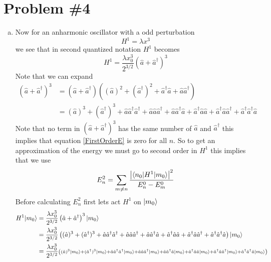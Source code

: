 \documentclass[11pt]{article}
\numberwithin{equation}{section}
\begin{document}
\section{Problem \#4}
\begin{enumerate}[(a)]
\item
Now for an anharmonic oscillator with a odd perturbation 
$$H^1 = \lambda x^3$$
we see that in second quantized notation $H^1$ becomes
$$H^1 = \frac{\lambda x_0^3}{2^{3/2}}\left(\hat{a}+\hat{a}^{\dagger}\right)^3$$
Note that we can expand
\begin{align*}
\left(\hat{a}+\hat{a}^{\dagger}\right)^3 &= \left(\hat{a}+\hat{a}^{\dagger}\right)\left((\hat{a})^2+(\hat{a}^{\dagger})^2 + \hat{a}^{\dagger}\hat{a} + \hat{a}\hat{a}^{\dagger}\right) \\
&= (\hat{a})^3+(\hat{a}^{\dagger})^3  + \hat{a}\hat{a}^{\dagger}\hat{a}^{\dagger}  + \hat{a}\hat{a}\hat{a}^{\dagger}  + \hat{a}\hat{a}^{\dagger}\hat{a} + \hat{a}^{\dagger}\hat{a}\hat{a} + \hat{a}^{\dagger}\hat{a}\hat{a}^{\dagger} + \hat{a}^{\dagger}\hat{a}^{\dagger}\hat{a}
\end{align*}
Note that no term in $(\hat{a}+\hat{a}^{\dagger})^3$ has the same number of $\hat{a}$ and $\hat{a}^{\dagger}$ this implies that equation \ref{FirstOrderE} is zero for all $n$. So to get an approximation of the energy we must go to second order in $H^1$ this implies that we use
\begin{equation}
E_n^2 = \sum_{m\ne n} \frac{\left|\langle{n_0}|H^1|{m_0}\rangle\right|^2}{E_n^0-E_m^0}
\label{2ndOrderE}
\end{equation}
Before calculating $E_n^2$ first lets act $H^1$ on $|{m_0}\rangle$
\begin{align*}
H^1\ket{m_0} &= \frac{\lambda x_0^3}{2^{3/2}}\left(\hat{a}+\hat{a}^{\dagger}\right)^3\ket{m_0}\\
&= \frac{\lambda x_0^3}{2^{3/2}}\left((\hat{a})^3+(\hat{a}^{\dagger})^3  + \hat{a}\hat{a}^{\dagger}\hat{a}^{\dagger}  + \hat{a}\hat{a}\hat{a}^{\dagger}  + \hat{a}\hat{a}^{\dagger}\hat{a} + \hat{a}^{\dagger}\hat{a}\hat{a} + \hat{a}^{\dagger}\hat{a}\hat{a}^{\dagger} + \hat{a}^{\dagger}\hat{a}^{\dagger}\hat{a}\right)\ket{m_0}\\
&= \frac{\lambda x_0^3}{2^{3/2}}\scriptstyle{\left((\hat{a})^3\ket{m_0} +(\hat{a}^{\dagger})^3\ket{m_0}  + \hat{a}\hat{a}^{\dagger}\hat{a}^{\dagger}\ket{m_0}  + \hat{a}\hat{a}\hat{a}^{\dagger}\ket{m_0}  + \hat{a}\hat{a}^{\dagger}\hat{a}\ket{m_0} + \hat{a}^{\dagger}\hat{a}\hat{a}\ket{m_0} + \hat{a}^{\dagger}\hat{a}\hat{a}^{\dagger}\ket{m_0} + \hat{a}^{\dagger}\hat{a}^{\dagger}\hat{a}\ket{m_0}\right)}\\

\end{align*}
\end{enumerate}
\end{document}
